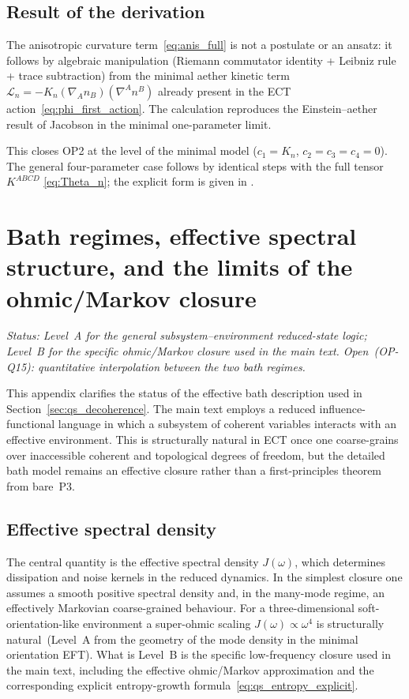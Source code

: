 \documentclass[11pt,a4paper]{article}
\numberwithin{equation}{section}
\begin{document}
\subsection{Result of the derivation}

The anisotropic curvature term~\eqref{eq:anis_full} is not a
postulate or an ansatz: it follows by algebraic manipulation
(Riemann commutator identity + Leibniz rule + trace subtraction)
from the minimal aether kinetic term
$\mathcal{L}_n = -K_n(\nabla_A n_B)(\nabla^A n^B)$
already present in the ECT action~\eqref{eq:phi_first_action}.
The calculation reproduces the Einstein--aether result of
Jacobson \cite{Jacobson2004} in the minimal one-parameter limit.

This closes OP2 at the level of the minimal model ($c_1=K_n$,
$c_2=c_3=c_4=0$).  The general four-parameter case follows
by identical steps with the full tensor $K^{ABCD}$
\eqref{eq:Theta_n}; the explicit form is given in
\cite{Jacobson2004}.

\clearpage

\section{Bath regimes, effective spectral structure, and the limits
of the ohmic/Markov closure}
\label{app:qs_bath_regimes}

\textit{Status: Level~A for the general subsystem--environment reduced-state
logic; Level~B for the specific ohmic/Markov closure used in the main text.
Open~(OP-Q15): quantitative interpolation between the two bath regimes.}

\medskip
This appendix clarifies the status of the effective bath description used
in Section~\ref{sec:qs_decoherence}.
The main text employs a reduced influence-functional language in which a
subsystem of coherent variables interacts with an effective environment.
This is structurally natural in ECT once one coarse-grains over
inaccessible coherent and topological degrees of freedom, but the detailed
bath model remains an effective closure rather than a first-principles
theorem from bare~P3.

\subsection*{Effective spectral density}

The central quantity is the effective spectral density $J(\omega)$,
which determines dissipation and noise kernels in the reduced dynamics.
In the simplest closure one assumes a smooth positive spectral density
and, in the many-mode regime, an effectively Markovian coarse-grained
behaviour.
For a three-dimensional soft-orientation-like environment a super-ohmic
scaling $J(\omega)\propto\omega^4$ is structurally natural~(Level~A from
the geometry of the mode density in the minimal orientation EFT).
What is Level~B is the specific low-frequency closure used in the main
text, including the effective ohmic/Markov approximation and the
corresponding explicit entropy-growth formula~\eqref{eq:qs_entropy_explicit}.
\end{document}
